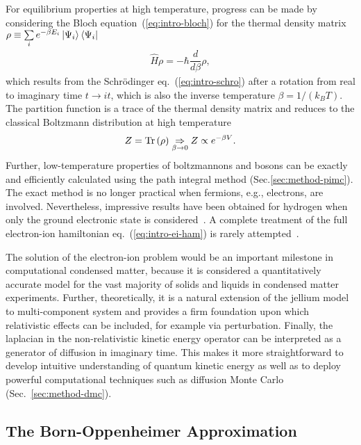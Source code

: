For equilibrium properties at high temperature, progress can be made by considering the Bloch equation~(\ref{eq:intro-bloch}) for the thermal density matrix $\rho\equiv\sum\limits_i e^{-\beta E_i} \ket{\Psi_i}\bra{\Psi_i}$
\begin{align} \label{eq:intro-bloch}
\hat{H} \rho = -\hbar\dfrac{d}{d\beta}\rho,
\end{align}
which results from the Schr\"odinger eq.~(\ref{eq:intro-schro}) after a rotation from real to imaginary time $t\rightarrow it$, which is also the inverse temperature $\beta=1/(k_BT)$.
The partition function is a trace of the thermal density matrix and reduces to the classical Boltzmann distribution at high temperature
\begin{align}
Z=\text{Tr}\left(\rho\right) \underset{\beta\rightarrow 0}{\Rightarrow} Z \propto e^{-\beta V}.
\end{align}
Further, low-temperature properties of boltzmannons and bosons can be exactly and efficiently calculated using the path integral method (Sec.\ref{sec:method-pimc}). The exact method is no longer practical when fermions, e.g., electrons, are involved. Nevertheless, impressive results have been obtained for hydrogen when only the ground electronic state is considered~\cite{Pierleoni2016b,Celliers2018}.
A complete treatment of the full electron-ion hamiltonian eq.~(\ref{eq:intro-ei-ham}) is rarely attempted~\cite{Ceperley1981,Natoli1995}.

The solution of the electron-ion problem would be an important milestone in computational condensed matter, because it is considered a quantitatively accurate model for the vast majority of solids and liquids in condensed matter experiments. Further, theoretically, it is a natural extension of the jellium model to multi-component system and provides a firm foundation upon which relativistic effects can be included, for example via perturbation. Finally, the laplacian in the non-relativistic kinetic energy operator can be interpreted as a generator of diffusion in imaginary time. This makes it more straightforward to develop intuitive understanding of quantum kinetic energy as well as to deploy powerful computational techniques such as diffusion Monte Carlo (Sec.~\ref{sec:method-dmc}).

\subsection{The Born-Oppenheimer Approximation}

